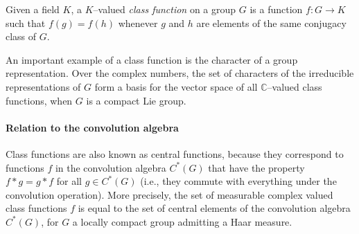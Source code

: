 \documentclass[12pt]{article}
\newcommand{\C}{\mathbb{C}}
\begin{document}
Given a field $K$, a $K$--valued {\em class function} on a group $G$ is a function $f: G \longrightarrow K$ such that $f(g) = f(h)$ whenever $g$ and $h$ are elements of the same conjugacy class of $G$.

An important example of a class function is the character of a group representation. Over the complex numbers, the set of characters of the irreducible representations of $G$ form a basis for the vector space of all $\C$--valued class functions, when $G$ is a compact Lie group.

\paragraph{Relation to the convolution algebra}

Class functions are also known as central functions, because they correspond to functions $f$ in the convolution algebra $C^*(G)$ that have the property $f*g = g*f$ for all $g \in C^*(G)$ (i.e., they commute with everything under the convolution operation).  More precisely, the set of measurable complex valued class functions $f$ is equal to the set of central elements of the convolution algebra $C^*(G)$, for $G$ a locally compact group admitting a Haar measure.
\end{document}
